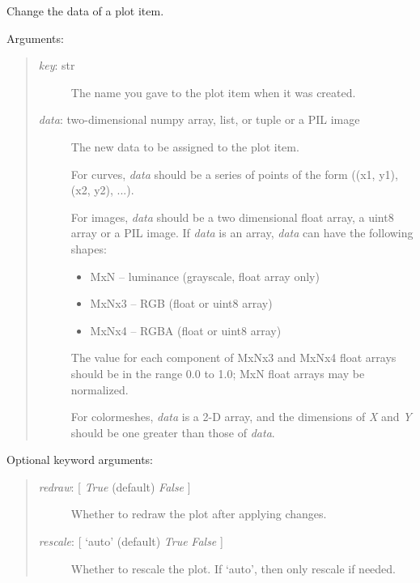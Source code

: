 \documentclass[letterpaper,10pt,english]{sphinxmanual}
\begin{document}
\begin{fulllineitems}
\begin{fulllineitems}
\label{api:mpl.Plot2D.set_data}
Change the data of a plot item.

Arguments:
\begin{quote}
\begin{description}
\item[{\emph{key}: str}] \leavevmode
The name you gave to the plot item when it was created.

\item[{\emph{data}: two-dimensional numpy array, list, or tuple or a PIL image}] \leavevmode
The new data to be assigned to the plot item.

For curves, \emph{data} should be a series of points 
of the form ((x1, y1), (x2, y2), ...).

For images, \emph{data} should be a two dimensional float array, a uint8 
array or a PIL image. If \emph{data} is an array, \emph{data} can have the 
following shapes:
\begin{itemize}
\item {} 
MxN -- luminance (grayscale, float array only)

\item {} 
MxNx3 -- RGB (float or uint8 array)

\item {} 
MxNx4 -- RGBA (float or uint8 array)

\end{itemize}

The value for each component of MxNx3 and MxNx4 float arrays should be
in the range 0.0 to 1.0; MxN float arrays may be normalized.

For colormeshes, \emph{data} is a 2-D array, and the dimensions of \emph{X} 
and \emph{Y} should be one greater than those of \emph{data}.

\end{description}
\end{quote}

Optional keyword arguments:
\begin{quote}
\begin{description}
\item[{\emph{redraw}: {[} \emph{True}  (default) \textbar{} \emph{False} {]}}] \leavevmode
Whether to redraw the plot after applying changes.

\item[{\emph{rescale}: {[} `auto' (default) \textbar{} \emph{True} \textbar{} \emph{False} {]}}] \leavevmode
Whether to rescale the plot. If `auto', then only rescale if needed.


\end{description}
\end{quote}
\end{fulllineitems}
\end{fulllineitems}
\end{document}
